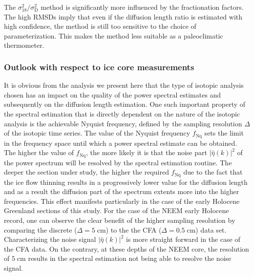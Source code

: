 \documentclass[11pt, draftcls, onecolumn]{IEEEtran} %
\numberwithin{equation}{section}
\numberwithin{table}{section}
\numberwithin{figure}{section}
\begin{document}
The ${\sigma^2_{18}}/{\sigma^2_\mathrm{D}}$ method is significantly more influenced by the 
fractionation factors. 
The high RMSDs imply that even if the diffusion length ratio is estimated with high confidence,
the method is still too sensitive to the choice of parameterization.
This makes the method less suitable as a paleoclimatic thermometer. 



\subsubsection{Outlook with respect to ice core measurements} \label{sec:outlook}
It is obvious from the analysis we present here that the type of isotopic analysis chosen has an 
impact on the quality of the power spectral estimates and subsequently on the diffusion length estimation.
One such important property of the spectral estimation that is directly dependent on the nature of the isotopic analysis
is the achievable Nyquist frequency, defined by the sampling resolution $\Delta$ of the isotopic time series.
The value of the Nyquist frequency $f_{\mathrm{Nq}}$ sets the limit in the frequency space until which a power spectral estimate can be obtained.
The higher the value of  $f_{\mathrm{Nq}}$, the more likely it is that the noise part  ${\vert \hat{\eta} \left( k \right) \vert} ^{2}$ 
of the power spectrum will be resolved by the spectral estimation routine.
The deeper the section under study, the higher the required $f_{\mathrm{Nq}}$ due to the fact that the ice flow thinning
results in a progressively lower value for the diffusion length and as a result the diffusion part of the spectrum extents
more into the higher frequencies. 
This effect manifests particularly in the case of the early Holocene Greenland sections of this study.
For the case of the NEEM early Holocene record, one can observe the clear benefit of the higher sampling resolution
by comparing the discrete ($\Delta = 5 \;\mathrm{cm}$) to the the CFA ($\Delta = 0.5 \;\mathrm{cm}$) data set.
Characterizing the noise  signal ${\vert \hat{\eta} \left( k \right) \vert} ^{2}$ is more straight forward in the case of the CFA data.
On the contrary, at these depths of the NEEM core, the resolution of $5 \;\mathrm{cm}$ results in the spectral estimation
not being able to resolve the noise signal.
\end{document}
